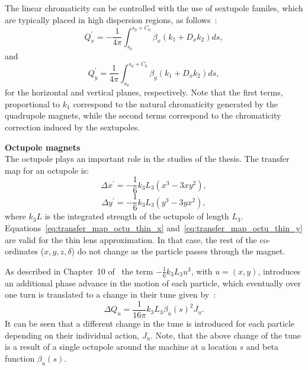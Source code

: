 The linear chromaticity can be controlled with the use of sextupole familes,  which are typically placed in high dispersion regions, as follows~\cite{wolski2014}:%
\begin{equation}
    Q_x^\prime = -\frac{1}{4\pi}\int_{s_0}^{s_0+C_0}\beta_x(k_1+D_x k_2)ds,
\end{equation}
and
\begin{equation}
    Q_y^\prime = \frac{1}{4\pi}\int_{s_0}^{s_0+C_0}\beta_y(k_1+D_x k_2)ds,
\end{equation}
for the horizontal and vertical planes, respectively. Note that the first terms, proportional to $k_1$ correspond to the natural chromaticity generated by the quadrupole magnets, while the second terms correspond to the chromaticity correction induced by the sextupoles.

\textbf{Octupole magnets}\\
The octupole plays an important role in the studies of the thesis.
The transfer map for an octupole is:
\begin{equation}\label{eq:transfer_map_octu_thin_x}
   \Delta x^\prime = -\frac{1}{6}{k_3L_3}(x^3-3xy^2),
\end{equation}
\begin{equation}\label{eq:transfer_map_octu_thin_y}
    \Delta y^\prime= -\frac{1}{6}{k_3L_3}(y^3-3yx^2),
 \end{equation}
 where $k_3L$ is the integrated strength of the octupole of length $L_3$. Equations~\eqref{eq:transfer_map_octu_thin_x} and~\eqref{eq:transfer_map_octu_thin_y} are valid for the thin lens approximation. %
 In that case, the rest of the co-ordinates ($x,y,z,\delta$) do not change as the particle passes through the magnet.


As described in Chapter~10 of~\cite{Stoel:2693915} the term $-\frac{1}{6}k_3L_3u^3$, with $u=(x,y)$, introduces an additional phase advance in the motion of each particle, which eventually over one turn is translated to a change in their tune given by~\cite{Stoel:2693915}:
\begin{equation}\label{eq:tune_shit_octupoles}
    \Delta Q_u  = \frac{1}{16 \pi} k_3L_3\beta_u(s)^2 J_u.
\end{equation}
It can be seen that a different change in the tune is introduced for each particle depending on their individual action, $J_u$. Note, that the above change of the tune is a result of a single octupole around the machine at a location $s$ and beta function $\beta_u(s)$. %

